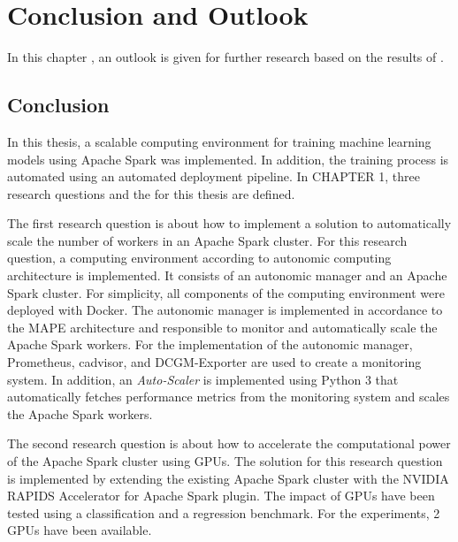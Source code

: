 \chapter{Conclusion and Outlook}
\label{chap:08_outlook}

In this chapter , an outlook is given for further research based on the results of .


\section{Conclusion}
In this thesis, a scalable computing environment for training machine learning models using Apache Spark was implemented. In addition, the training process is automated using an automated deployment pipeline.
In CHAPTER 1, three research questions and the  for this thesis are defined.


The first research question is about how to implement a solution to automatically scale the number of workers in an Apache Spark cluster.
For this research question, a computing environment according to autonomic computing architecture  is implemented.
It consists of an autonomic manager and an Apache Spark cluster.
For simplicity, all components of the computing environment were deployed with Docker.
The autonomic manager is implemented in accordance to the MAPE architecture and responsible to monitor and automatically scale the Apache Spark workers.
For the implementation of the autonomic manager, Prometheus, cadvisor, and DCGM-Exporter are used to create a monitoring system.
In addition, an \textit{Auto-Scaler} is implemented using Python 3 that automatically fetches performance metrics from the monitoring system and scales the Apache Spark workers.


The second research question is about how to accelerate the computational power of the Apache Spark cluster using GPUs.
The solution for this research question is implemented by extending the existing Apache Spark cluster with the NVIDIA RAPIDS Accelerator for Apache Spark plugin.
%
The impact of GPUs have been tested using a classification and a regression benchmark. For the experiments, 2 GPUs have been available. 



